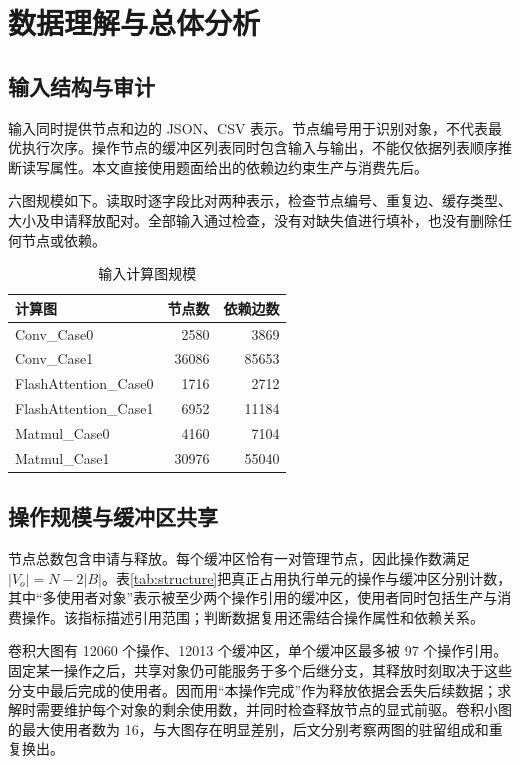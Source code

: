 \section{数据理解与总体分析}
\subsection{输入结构与审计}
输入同时提供节点和边的 JSON、CSV 表示。节点编号用于识别对象，不代表最优执行次序。操作节点的缓冲区列表同时包含输入与输出，不能仅依据列表顺序推断读写属性。本文直接使用题面给出的依赖边约束生产与消费先后。

六图规模如下。读取时逐字段比对两种表示，检查节点编号、重复边、缓存类型、大小及申请释放配对。全部输入通过检查，没有对缺失值进行填补，也没有删除任何节点或依赖。
\begin{table}[H]\centering\caption{输入计算图规模}\small
\begin{tabular}{lrr}\toprule 计算图 & 节点数 & 依赖边数\\\midrule
Conv\_Case0 & 2580 & 3869\\
Conv\_Case1 & 36086 & 85653\\
FlashAttention\_Case0 & 1716 & 2712\\
FlashAttention\_Case1 & 6952 & 11184\\
Matmul\_Case0 & 4160 & 7104\\
Matmul\_Case1 & 30976 & 55040\\\bottomrule
\end{tabular}\end{table}

\subsection{操作规模与缓冲区共享}
节点总数包含申请与释放。每个缓冲区恰有一对管理节点，因此操作数满足 $|V_o|=N-2|B|$。表\ref{tab:structure}把真正占用执行单元的操作与缓冲区分别计数，其中“多使用者对象”表示被至少两个操作引用的缓冲区，使用者同时包括生产与消费操作。该指标描述引用范围；判断数据复用还需结合操作属性和依赖关系。
\begin{table}[H]\centering\small
\caption{操作规模与缓冲区引用结构}\label{tab:structure}
\end{table}

卷积大图有 12060 个操作、12013 个缓冲区，单个缓冲区最多被 97 个操作引用。固定某一操作之后，共享对象仍可能服务于多个后继分支，其释放时刻取决于这些分支中最后完成的使用者。因而用“本操作完成”作为释放依据会丢失后续数据；求解时需要维护每个对象的剩余使用数，并同时检查释放节点的显式前驱。卷积小图的最大使用者数为 16，与大图存在明显差别，后文分别考察两图的驻留组成和重复换出。

